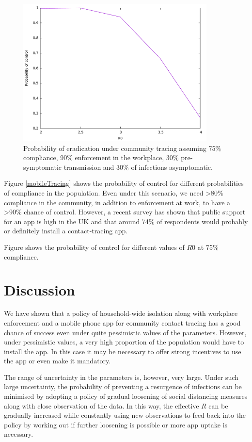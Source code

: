 \documentclass{article}
\begin{document}
\begin{figure}
\begin{center}
\includegraphics[width = 10cm]{mobileTracingR0.pdf}
\end{center}
\caption{Probability of eradication under community tracing assuming 75\% compliance, 90\% enforcement in the workplace, 30\% pre-symptomatic transmission and 30\% of infections asymptomatic.}
\label{fulltrace3.5}
\end{figure}


Figure \ref{mobileTracing} shows the probability of control for different probabilities of compliance in the population. Even under this scenario, we need >80\% compliance in the community, in addition to enforcement at work, to have a >90\% chance of control. However, a recent survey\cite{abeler2020Support} has shown that public support for an app is high in the UK and that around 74\% of respondents would probably or definitely install a contact-tracing app.

Figure shows the probability of control for different values of $R0$ at 75\% compliance.

\section{Discussion}

We have shown that a policy of household-wide isolation along with workplace enforcement and a mobile phone app for community contact tracing has a good chance of success even under quite pessimistic values of the parameters. However, under pessimistic values, a very high proportion of the population would have to install the app. In this case it may be necessary to offer strong incentives to use the app or even make it mandatory.

The range of uncertainty in the parameters is, however, very large. Under such large uncertainty, the probability of preventing a resurgence of infections can be minimised by adopting a policy of gradual loosening of social distancing measures along with close observation of the data. In this way, the effective $R$ can be gradually increased while constantly using new observations to feed back into the policy by working out if further loosening is possible or more app uptake is necessary.

%
% 


\end{document}
